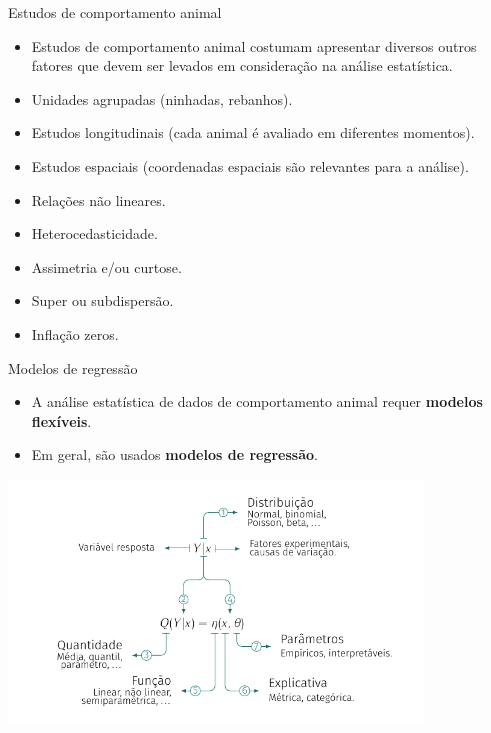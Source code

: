 \documentclass[
  ignorenonframetext,
  serif,
  professionalfont,
  usenames,
  dvipsnames,
  aspectratio = 169]{beamer}
\providecommand{\tightlist}{%
  \setlength{\itemsep}{0pt}\setlength{\parskip}{0pt}}
\renewcommand{\tightlist}{%
  \setlength{\itemsep}{0\baselineskip}
  \setlength{\parskip}{0.25\baselineskip}
}
\def\beginAHalfColumn{\begin{minipage}{0.49\textwidth}}%
\def\beginAThirdColumn{\begin{minipage}{0.31\textwidth}}%
\def\beginTwoThirdsColumn{\begin{minipage}{0.64\textwidth}}%
\def\endColumns{\end{minipage}}%
\begin{document}
\begin{frame}{Estudos de comportamento animal}
\protect\hypertarget{estudos-de-comportamento-animal-2}{}
\begin{itemize}
\tightlist
\item
  Estudos de comportamento animal costumam apresentar diversos outros
  fatores que devem ser levados em consideração na análise estatística.
\end{itemize}

\beginAHalfColumn

\begin{itemize}
\item
  Unidades agrupadas (ninhadas, rebanhos).
\item
  Estudos longitudinais (cada animal é avaliado em diferentes momentos).
\item
  Estudos espaciais (coordenadas espaciais são relevantes para a
  análise).
\end{itemize}

\endColumns
\beginAHalfColumn

\begin{itemize}
\item
  Relações não lineares.
\item
  Heterocedasticidade.
\item
  Assimetria e/ou curtose.
\item
  Super ou subdispersão.
\item
  Inflação zeros.
\end{itemize}

\endColumns
\end{frame}

\begin{frame}{Modelos de regressão}
\protect\hypertarget{modelos-de-regressuxe3o}{}
\beginAThirdColumn

\begin{itemize}
\item
  A análise estatística de dados de comportamento animal requer
  \textbf{modelos flexíveis}.
\item
  Em geral, são usados \textbf{modelos de regressão}.
\end{itemize}

\endColumns
\beginTwoThirdsColumn

\begin{center}\includegraphics[width=11cm]{./img/modelos_regressao} \end{center}

\endColumns
\end{frame}
\end{document}
